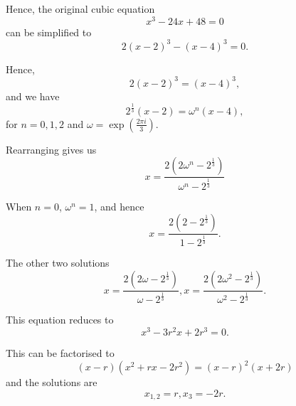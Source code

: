 Hence, the original cubic equation
\[
    x^3 - 24x + 48 = 0
\]
can be simplified to
\[
    2 (x - 2) ^ 3 - (x - 4)^3 = 0.
\]

Hence,
\[
    2(x - 2)^3 = (x - 4)^3,
\]
and we have
\[
    2^{\frac{1}{3}} (x - 2) = \omega^n (x - 4),
\]
for \(n = 0, 1, 2\) and \(\omega = \exp \left(\frac{2\pi i}{3}\right)\).

Rearranging gives us
\[
    x = \frac{2 \left(2\omega^n - 2^{\frac{1}{3}}\right)}{\omega^n - 2^{\frac{1}{3}}}
\]

When \(n = 0\), \(\omega^n = 1\), and hence
\[
    x = \frac{2 \left(2 - 2^{\frac{1}{3}}\right)}{1 - 2^{\frac{1}{3}}}.
\]

The other two solutions
\[
    x = \frac{2 \left(2 \omega - 2^{\frac{1}{3}}\right)}{\omega - 2^{\frac{1}{3}}}, x = \frac{2 \left(2 \omega^2 - 2^{\frac{1}{3}}\right)}{\omega^2 - 2^{\frac{1}{3}}}.
\]

This equation reduces to
\[
    x^3 - 3r^2 x + 2 r^3 = 0.
\]

This can be factorised to
\[
    (x - r)(x^2 + rx - 2r^2) = (x - r)^2 (x + 2r)
\]
and the solutions are
\[
    x_{1, 2} = r, x_3 = -2r.
\]